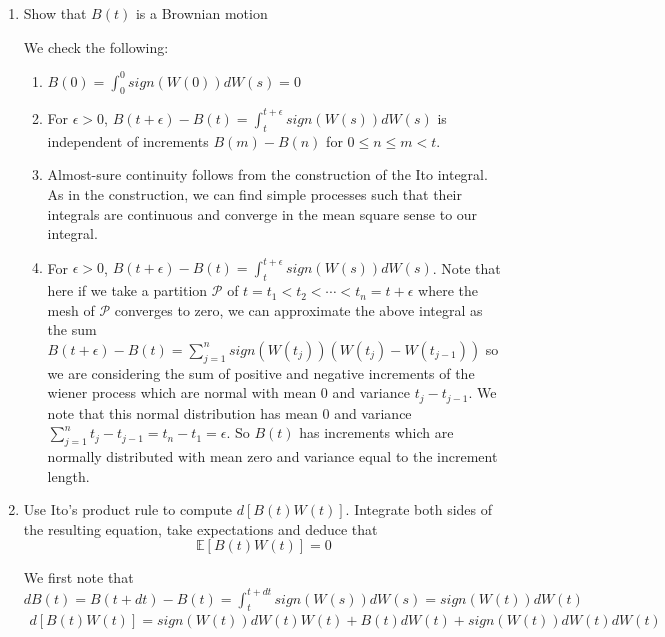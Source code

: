 \documentclass[12pt,twoside, letter]{exam}
\theoremstyle{definition}
\newcommand{\ee}{\mathbb{E}}
\begin{document}
  \begin{enumerate}
    \item Show that $B(t)$ is a Brownian motion
      \begin{solution}
        We check the following:
          \begin{enumerate}
            \item $B(0) = \int^0_0 sign(W(0)) dW(s) = 0$
            \item For $\epsilon > 0$, $B(t + \epsilon) - B(t) = \int^{t+\epsilon}_{t} sign(W(s)) dW(s)$ is independent of increments $B(m) - B(n)$ for
              $0 \leq n \leq m < t$.
            \item Almost-sure continuity follows from the construction of the Ito integral. As in the construction, we can find simple processes such that their integrals are continuous
              and converge in the mean square sense to our integral.
            \item For $\epsilon > 0$, $B(t + \epsilon) - B(t) = \int^{t+\epsilon}_{t} sign(W(s)) dW(s)$. Note that here if we take a partition $\mathcal{P}$ of
              $t = t_1 < t_2 < \cdots < t_n = t+\epsilon$ where the mesh of $\mathcal{P}$ converges to zero, we can approximate the above integral as the sum
              $B(t + \epsilon) - B(t) = \sum_{j=1}^{n} sign(W(t_j)) (W(t_{j}) - W(t_{j-1}))$ so we are considering the sum of positive and negative increments of the wiener process which are
              normal with mean 0 and variance $t_{j} - t_{j-1}$. We note that this normal distribution has mean 0 and variance $\sum_{j=1}^{n} t_{j}-t_{j-1} = t_n - t_1 = \epsilon$.
              So $B(t)$ has increments which are normally distributed with mean zero and variance equal to the increment length.
          \end{enumerate}
      \end{solution}
    \item Use Ito's product rule to compute $d[B(t)W(t)]$. Integrate both sides of the
      resulting equation, take expectations and deduce that
        \begin{equation*}
          \ee[B(t)W(t)] = 0
        \end{equation*}
      \begin{solution}
        We first note that $dB(t) = B(t+dt) - B(t) = \int^{t+dt}_t sign(W(s)) dW(s) = sign(W(t))dW(t)$
        \begin{align*}
          d[B(t)W(t)] = sign(W(t))dW(t)W(t) + B(t)dW(t) + sign(W(t))dW(t)dW(t)
        \end{align*}

\end{solution}
\end{enumerate}
\end{document}
